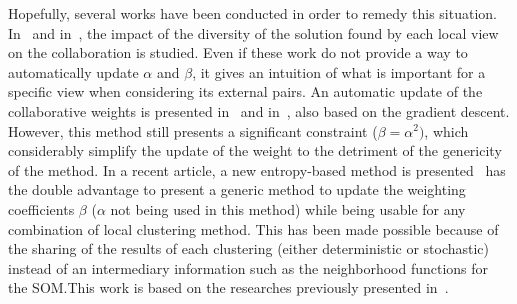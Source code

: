 \documentclass[a4paper]{report}
\begin{document}
    Hopefully, several works have been conducted in order to remedy this situation. In~\cite{grozavu2014diversity} and in~\cite{rastin2015collaborative}, the impact of the diversity of the solution found by each local view on the collaboration is studied. Even if these work do not provide a way to automatically update $\alpha$ and $\beta$, it gives an intuition of what is important for a specific view when considering its external pairs. An automatic update of the collaborative weights is presented in~\cite{grozavu2010topological} and in~\cite{grozavu2011learning}, also based on the gradient descent. However, this method still presents a significant constraint ($\beta = \alpha^2)$, which considerably simplify the update of the weight to the detriment of the genericity of the method. In a recent article, a new entropy-based method is presented~\cite{sublime2018optimizing} has the double advantage to present a generic method to update the weighting coefficients $\beta$ ($\alpha$ not being used in this method) while being usable for any combination of local clustering method. This has been made possible because of the sharing of the results of each clustering (either deterministic or stochastic) instead of an intermediary information such as the neighborhood functions for the SOM.\@ This work is based on the researches previously presented in~\cite{sublime2016contributions}.

    
    
\end{document}
